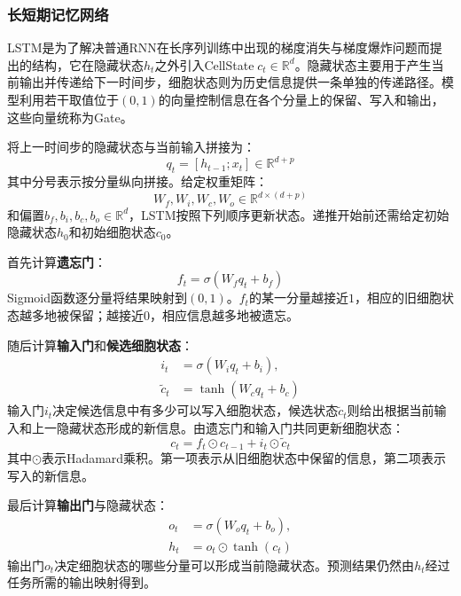 \subsubsection{长短期记忆网络}
\gls{LSTM}是为了解决普通RNN在长序列训练中出现的梯度消失与梯度爆炸问题而提出的结构，它在隐藏状态$h_t$之外引入\gls{CellState}$\;c_t\in\mathbb{R}^d$。隐藏状态主要用于产生当前输出并传递给下一时间步，细胞状态则为历史信息提供一条单独的传递路径。模型利用若干取值位于$(0,1)$的向量控制信息在各个分量上的保留、写入和输出，这些向量统称为\gls{Gate}。\par
将上一时间步的隐藏状态与当前输入拼接为：
\begin{equation*}
	q_t=[h_{t-1};x_t]\in\mathbb{R}^{d+p}
\end{equation*}
其中分号表示按分量纵向拼接。给定权重矩阵：
\begin{equation*}
	W_f,W_i,W_c,W_o\in\mathbb{R}^{d\times(d+p)}
\end{equation*}
和偏置$b_f,b_i,b_c,b_o\in\mathbb{R}^d$，LSTM按照下列顺序更新状态。递推开始前还需给定初始隐藏状态$h_0$和初始细胞状态$c_0$。\par
首先计算\textbf{遗忘门}：
\begin{equation*}
	f_t=\sigma(W_fq_t+b_f)
\end{equation*}
Sigmoid函数逐分量将结果映射到$(0,1)$。$f_t$的某一分量越接近$1$，相应的旧细胞状态越多地被保留；越接近$0$，相应信息越多地被遗忘。\par
随后计算\textbf{输入门}和\textbf{候选细胞状态}：
\begin{align*}
	i_t&=\sigma(W_iq_t+b_i),\\
	\widetilde{c}_t&=\tanh(W_cq_t+b_c)
\end{align*}
输入门$i_t$决定候选信息中有多少可以写入细胞状态，候选状态$\widetilde{c}_t$则给出根据当前输入和上一隐藏状态形成的新信息。由遗忘门和输入门共同更新细胞状态：
\begin{equation*}
	c_t=f_t\odot c_{t-1}+i_t\odot\widetilde{c}_t
\end{equation*}
其中$\odot$表示Hadamard乘积。第一项表示从旧细胞状态中保留的信息，第二项表示写入的新信息。\par
最后计算\textbf{输出门}与隐藏状态：
\begin{align*}
	o_t&=\sigma(W_oq_t+b_o),\\
	h_t&=o_t\odot\tanh(c_t)
\end{align*}
输出门$o_t$决定细胞状态的哪些分量可以形成当前隐藏状态。预测结果仍然由$h_t$经过任务所需的输出映射得到。\par
